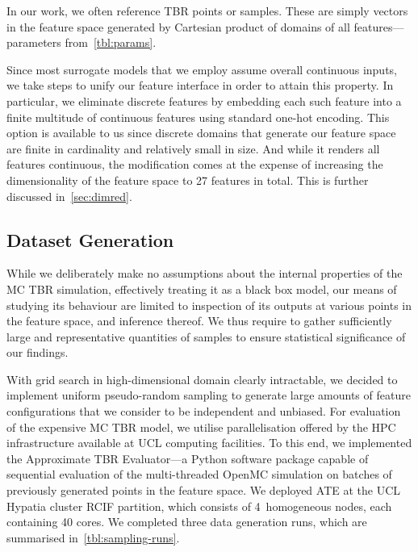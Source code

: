 In our work, we often reference TBR points or samples. These are simply vectors
in the feature space generated by Cartesian product of domains of all
features---parameters from~\cref{tbl:params}.

Since most surrogate models
that we employ assume overall continuous inputs, we take steps to unify our
feature interface in order to attain this property. In particular, we eliminate
discrete features by embedding each such feature into a finite multitude of
continuous features using standard one-hot encoding. This option is available to
us since discrete domains that generate our feature space are finite in
cardinality and relatively small in size. And while it renders all features continuous, the
modification comes at the expense of increasing the dimensionality of the
feature space to 27 features in total. This is further discussed
in~\cref{sec:dimred}.


\subsection{Dataset Generation}
\label{sec:dataset-generation}

While we deliberately make no assumptions about the internal properties of the
MC TBR simulation, effectively treating it as a black box model, our means of
studying its behaviour are limited to inspection of its outputs at various
points in the feature space, and inference thereof. We thus require to
gather sufficiently large and representative quantities of samples to ensure
statistical significance of our findings.

With grid search in high-dimensional domain clearly intractable, we decided to
implement uniform pseudo-random sampling to generate large amounts of feature
configurations that we consider to be independent and unbiased. For evaluation
of the expensive MC TBR model, we utilise parallelisation offered by
the HPC infrastructure available at UCL computing facilities. To this end, we
implemented the Approximate TBR Evaluator---a Python software package capable of
sequential evaluation of the multi-threaded OpenMC simulation on batches of
previously generated points in the feature space.
We deployed ATE at the UCL Hypatia cluster RCIF partition, which consists of
4~homogeneous nodes, each containing 40 cores. We completed three data
generation runs, which are summarised in~\cref{tbl:sampling-runs}.

